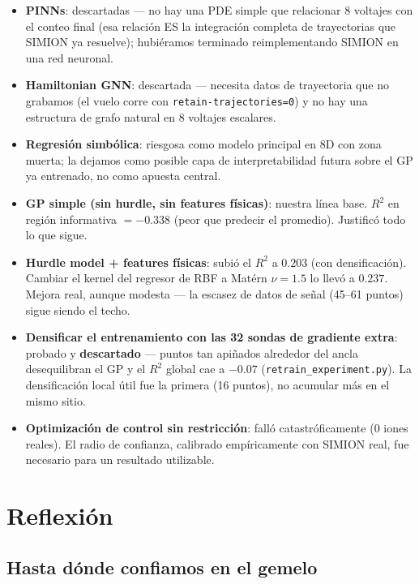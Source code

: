 \documentclass[11pt]{article}
\begin{document}
\begin{itemize}
  \item \textbf{PINNs}: descartadas — no hay una PDE simple que relacionar 8 voltajes con
  el conteo final (esa relación ES la integración completa de trayectorias que SIMION ya
  resuelve); hubiéramos terminado reimplementando SIMION en una red neuronal.
  \item \textbf{Hamiltonian GNN}: descartada — necesita datos de trayectoria que no
  grabamos (el vuelo corre con \texttt{retain-trajectories=0}) y no hay una estructura de
  grafo natural en 8 voltajes escalares.
  \item \textbf{Regresión simbólica}: riesgosa como modelo principal en 8D con zona
  muerta; la dejamos como posible capa de interpretabilidad futura sobre el GP ya
  entrenado, no como apuesta central.
  \item \textbf{GP simple (sin hurdle, sin features físicas)}: nuestra línea base.
  $R^2$ en región informativa $=-0.338$ (peor que predecir el promedio). Justificó todo
  lo que sigue.
  \item \textbf{Hurdle model + features físicas}: subió el $R^2$ a $0.203$ (con
  densificación). Cambiar el kernel del regresor de RBF a Mat\'ern $\nu=1.5$ lo llevó a
  $\mathbf{0.237}$. Mejora real, aunque modesta — la escasez de datos de señal (45--61
  puntos) sigue siendo el techo.
  \item \textbf{Densificar el entrenamiento con las 32 sondas de gradiente extra}:
  probado y \textbf{descartado} — puntos tan apiñados alrededor del ancla desequilibran
  el GP y el $R^2$ global cae a $-0.07$ (\texttt{retrain\_experiment.py}). La
  densificación local útil fue la primera (16 puntos), no acumular más en el mismo sitio.
  \item \textbf{Optimización de control sin restricción}: falló catastróficamente (0
  iones reales). El radio de confianza, calibrado empíricamente con SIMION real, fue
  necesario para un resultado utilizable.
\end{itemize}

\section{Reflexión}
\label{sec:reflexion}

\subsection{Hasta dónde confiamos en el gemelo}
\end{document}
